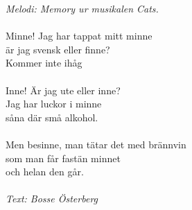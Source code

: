 {\footnotesize\textit{Melodi: Memory ur musikalen Cats.}}\\
\\
Minne! Jag har tappat mitt minne\\
är jag svensk eller finne?\\
Kommer inte ihåg\\
\\
Inne! Är jag ute eller inne?\\
Jag har luckor i minne\\
såna där små alkohol.\\
\\
Men besinne, man tätar det med brännvin \\
som man får fastän minnet \\
och helan den går.\\
\\
{\footnotesize\textit{Text: Bosse Österberg}}

